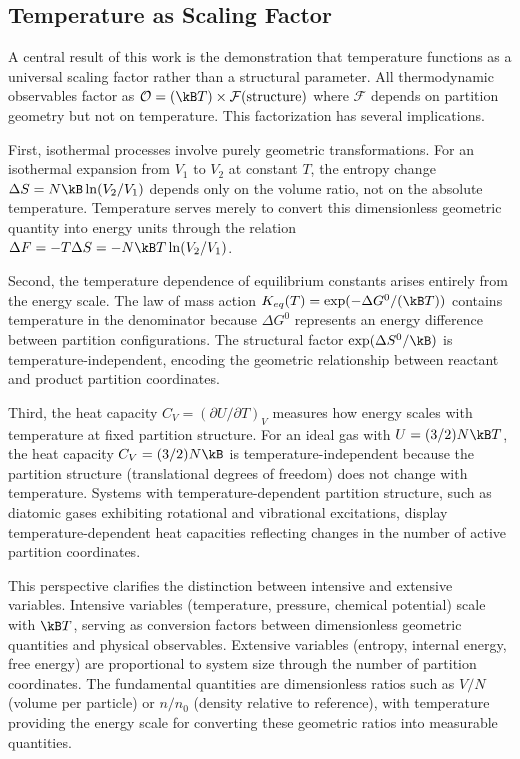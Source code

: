 \subsection{Temperature as Scaling Factor}

A central result of this work is the demonstration that temperature functions as a universal scaling factor rather than a structural parameter. All thermodynamic observables factor as $\mathcal{O} = (\kB T) \times \mathcal{F}(\text{structure})$ where $\mathcal{F}$ depends on partition geometry but not on temperature. This factorization has several implications.

First, isothermal processes involve purely geometric transformations. For an isothermal expansion from $V_1$ to $V_2$ at constant $T$, the entropy change $\Delta S = N\kB \ln(V_2/V_1)$ depends only on the volume ratio, not on the absolute temperature. Temperature serves merely to convert this dimensionless geometric quantity into energy units through the relation $\Delta F = -T \Delta S = -N\kB T \ln(V_2/V_1)$.

Second, the temperature dependence of equilibrium constants arises entirely from the energy scale. The law of mass action $K_{eq}(T) = \exp(-\Delta G^0/(\kB T))$ contains temperature in the denominator because $\Delta G^0$ represents an energy difference between partition configurations. The structural factor $\exp(\Delta S^0/\kB)$ is temperature-independent, encoding the geometric relationship between reactant and product partition coordinates.

Third, the heat capacity $C_V = (\partial U/\partial T)_V$ measures how energy scales with temperature at fixed partition structure. For an ideal gas with $U = (3/2)N\kB T$, the heat capacity $C_V = (3/2)N\kB$ is temperature-independent because the partition structure (translational degrees of freedom) does not change with temperature. Systems with temperature-dependent partition structure, such as diatomic gases exhibiting rotational and vibrational excitations, display temperature-dependent heat capacities reflecting changes in the number of active partition coordinates.

This perspective clarifies the distinction between intensive and extensive variables. Intensive variables (temperature, pressure, chemical potential) scale with $\kB T$, serving as conversion factors between dimensionless geometric quantities and physical observables. Extensive variables (entropy, internal energy, free energy) are proportional to system size through the number of partition coordinates. The fundamental quantities are dimensionless ratios such as $V/N$ (volume per particle) or $n/n_0$ (density relative to reference), with temperature providing the energy scale for converting these geometric ratios into measurable quantities.

